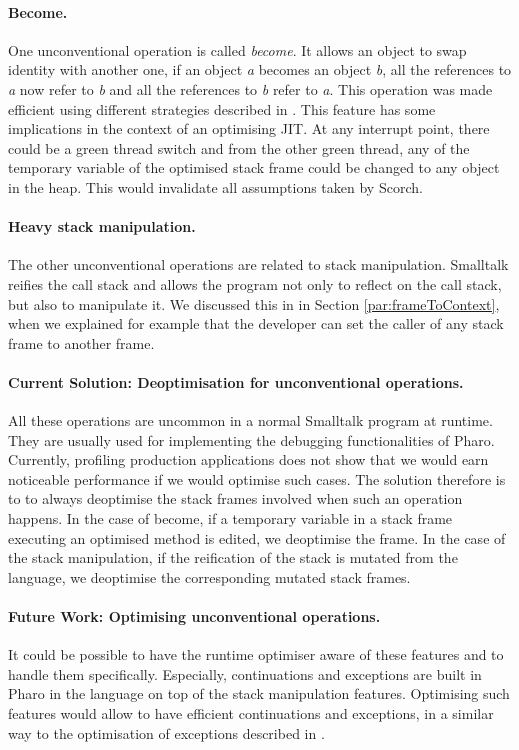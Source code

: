 \documentclass[a4paper,12pt,twoside]{../includes/ThesisStyle}
\begin{document}
\paragraph{Become.} One unconventional operation is called \emph{become}. It allows an object to swap identity with another one, \ie if an object \emph{a} becomes an object \emph{b}, all the references to \emph{a} now refer to \emph{b} and all the references to \emph{b} refer to \emph{a}. This operation was made efficient using different strategies described in \cite{Mir15a}. This feature has some implications in the context of an optimising JIT. At any interrupt point, there could be a green thread switch and from the other green thread, any of the temporary variable of the optimised stack frame could be changed to any object in the heap. This would invalidate all assumptions taken by Scorch.

\paragraph{Heavy stack manipulation.} The other unconventional operations are related to stack manipulation. Smalltalk reifies the call stack and allows the program not only to reflect on the call stack, but also to manipulate it. We discussed this in in Section \ref{par:frameToContext}, when we explained for example that the developer can set the caller of any stack frame to another frame.

\paragraph{Current Solution: Deoptimisation for unconventional operations.} All these operations are uncommon in a normal Smalltalk program at runtime.  They are usually used for implementing the debugging functionalities of Pharo. Currently, profiling production applications does not show that we would earn noticeable performance if we would optimise such cases. The solution therefore is to to always deoptimise the stack frames involved when such an operation happens. In the case of become, if a temporary variable in a stack frame executing an optimised method is edited, we deoptimise the frame. In the case of the stack manipulation, if the reification of the stack is mutated from the language, we deoptimise the corresponding mutated stack frames.

\paragraph{Future Work: Optimising unconventional operations.} It could be possible to have the runtime optimiser aware of these features and to handle them specifically. Especially, continuations and exceptions are built in Pharo in the language on top of the stack manipulation features. Optimising such features would allow to have efficient continuations and exceptions, in a similar way to the optimisation of exceptions described in \cite{Ogas01a}. 
\end{document}
